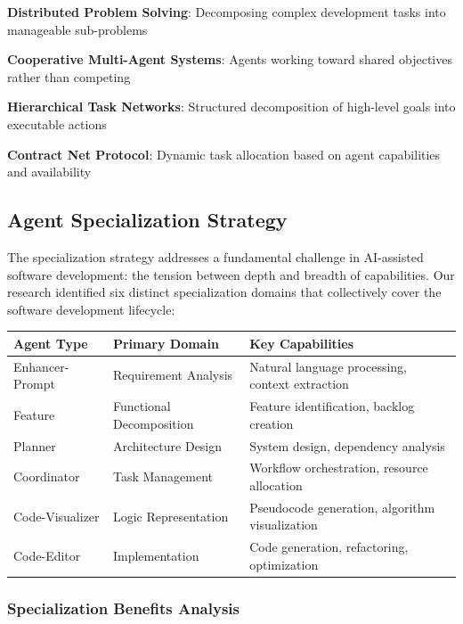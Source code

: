 \begin{compactlist}
    \item \textbf{Distributed Problem Solving}: Decomposing complex development tasks into manageable sub-problems
    \item \textbf{Cooperative Multi-Agent Systems}: Agents working toward shared objectives rather than competing
    \item \textbf{Hierarchical Task Networks}: Structured decomposition of high-level goals into executable actions
    \item \textbf{Contract Net Protocol}: Dynamic task allocation based on agent capabilities and availability
\end{compactlist}

\subsection*{Agent Specialization Strategy}

The specialization strategy addresses a fundamental challenge in AI-assisted software development: the tension between depth and breadth of capabilities. Our research identified six distinct specialization domains that collectively cover the software development lifecycle:

\begin{center}
\begin{tabular}{@{}lll@{}}
\toprule
\textbf{Agent Type} & \textbf{Primary Domain} & \textbf{Key Capabilities} \\
\midrule
Enhancer-Prompt & Requirement Analysis & Natural language processing, context extraction \\
Feature & Functional Decomposition & Feature identification, backlog creation \\
Planner & Architecture Design & System design, dependency analysis \\
Coordinator & Task Management & Workflow orchestration, resource allocation \\
Code-Visualizer & Logic Representation & Pseudocode generation, algorithm visualization \\
Code-Editor & Implementation & Code generation, refactoring, optimization \\
\bottomrule
\end{tabular}
\end{center}

\subsubsection*{Specialization Benefits Analysis}

